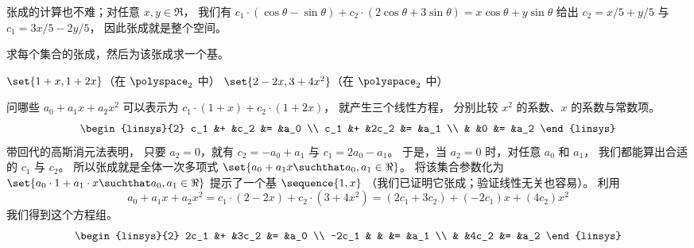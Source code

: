\begin{exercises}
\begin{answer}
      张成的计算也不难；对任意 $x,y\in\Re$，
      我们有
      \( c_1\cdot(\cos\theta-\sin\theta)+c_2\cdot(2\cos\theta+3\sin\theta)=
        x\cos\theta+y\sin\theta \)
      给出 \( c_2=x/5+y/5 \) 与 \( c_1=3x/5-2y/5 \)，
      因此张成就是整个空间。
    \end{answer}
  \recommended \item
    求每个集合的张成，然后为该张成求一个基。
    \begin{exparts*}
       \partsitem $\set{1+x,1+2x}$（在 $\polyspace_2$ 中）
       \partsitem $\set{2-2x,3+4x^2}$（在 $\polyspace_2$ 中）
    \end{exparts*}
    \begin{answer}
      \begin{exparts}
         \partsitem 问哪些 $a_0+a_1x+a_2x^2$ 可以表示为
           $c_1\cdot (1+x)+c_2\cdot (1+2x)$，
           就产生三个线性方程，
           分别比较 $x^2$ 的系数、$x$ 的系数与常数项。
           \begin{equation*}
             \begin{linsys}{2}
               c_1 &+ &c_2  &= &a_0 \\
               c_1 &+ &2c_2 &= &a_1 \\
                   &  &0    &= &a_2
             \end{linsys}
           \end{equation*}
           带回代的高斯消元法表明，
           只要 $a_2=0$，就有 $c_2=-a_0+a_1$
           与 $c_1=2a_0-a_1$。
           于是，当 $a_2=0$ 时，对任意 $a_0$ 和 $a_1$，
           我们都能算出合适的
           $c_1$ 与 $c_2$。
           所以张成就是全体一次多项式
           $\set{a_0+a_1x\suchthat a_0,a_1\in\Re}$。
           将该集合参数化为
           $\set{a_0\cdot 1+a_1\cdot x\suchthat a_0,a_1\in\Re}$
           提示了一个基 $\sequence{1,x}$
           （我们已证明它张成；验证线性无关也容易）。
        \partsitem 利用
          \begin{equation*}
            a_0+a_1x+a_2x^2
            =c_1\cdot(2-2x)+c_2\cdot(3+4x^2)
            =(2c_1+3c_2)+(-2c_1)x+(4c_2)x^2
          \end{equation*}
          我们得到这个方程组。
           \begin{equation*}
             \begin{linsys}{2}
               2c_1  &+ &3c_2  &= &a_0 \\
               -2c_1 &  &      &= &a_1 \\
                     &  &4c_2  &= &a_2
              \end{linsys}

\end{equation*}
\end{exparts}
\end{answer}
\end{exercises}
